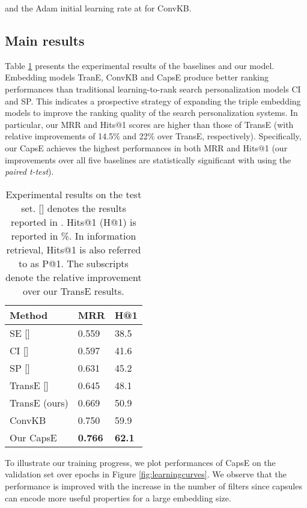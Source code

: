\documentclass[11pt,a4paper]{article}
\begin{document}
and the Adam initial learning rate at  for ConvKB. 

\subsection{Main  results}
Table \ref{tab:resultssp} presents the experimental results of the baselines and our model. 
Embedding models TranE, ConvKB and CapsE produce better ranking performances than  traditional learning-to-rank search personalization models CI and SP.
This indicates a prospective strategy of expanding the triple embedding models to improve the ranking quality of the search personalization systems. 
In particular, our MRR and Hits@1 scores are higher than those of TransE (with relative improvements of 14.5\% and 22\% over TransE, respectively). 
Specifically, our CapsE achieves the highest performances in both MRR and Hits@1 (our improvements over all five baselines are statistically significant with  using the \textit{paired t-test}). 



\begin{table}[!t]
\centering
\begin{tabular}{l|ll}
\hline
\textbf{Method} & \textbf{MRR} & \textbf{H@1}\\
\hline
SE []  & 0.559 & 38.5 \\
CI []  & 0.597 & 41.6 \\
SP []  & 0.631 & 45.2 \\
TransE []  & 0.645 & 48.1 \\
\hline
TransE (ours) & 0.669 & 50.9 \\
ConvKB & 0.750 & 59.9 \\
\hline
Our CapsE & \textbf{0.766} & \textbf{62.1} \\
\hline
\end{tabular}
\caption{Experimental results on the test set. [] denotes the results reported in  \citep{vu2017search}. Hits@1  (H@1) is reported in \%. In information retrieval, Hits@1 is also referred to as P@1. The subscripts denote the relative improvement over our TransE results.} 
\label{tab:resultssp}
\end{table}

To illustrate our training progress, we plot performances of CapsE on the validation set over epochs in Figure \ref{fig:learningcurves}. 
We observe that the performance is improved with the increase in the number of filters since capsules can encode more useful properties for a large embedding size.
\end{document}
